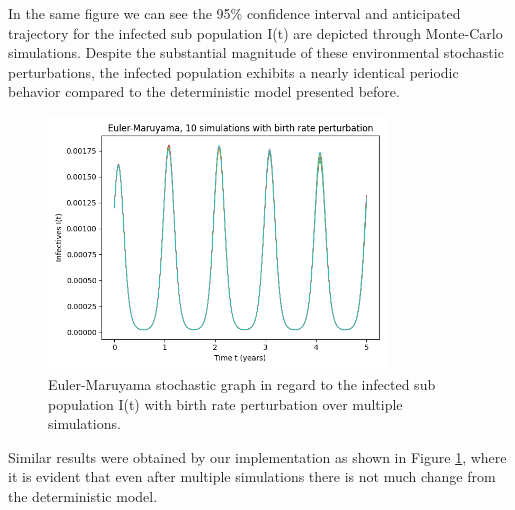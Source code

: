 In the same figure we can see the 95\% confidence interval and anticipated trajectory for the infected sub population I(t) are depicted through Monte-Carlo simulations. Despite the substantial magnitude of these environmental stochastic perturbations, the infected population exhibits a nearly identical periodic behavior compared to the deterministic model presented before.

\begin{figure}[ht]
  \centering
  \includegraphics[width=0.8\textwidth]{IMG/birth_aphabig_I(t).png}
  \caption{Euler-Maruyama stochastic graph in regard to the infected sub population I(t) with birth rate perturbation over multiple simulations.}
  \label{birth2}
\end{figure}

Similar results were obtained by our implementation as shown in Figure \ref{birth2}, where it is evident that even after multiple simulations there is not much change from the deterministic model.
